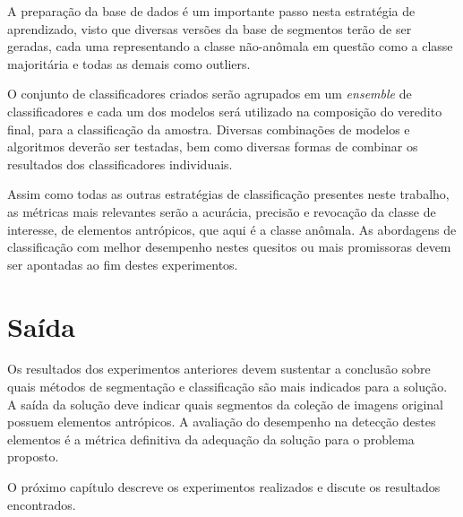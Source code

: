 A preparação da base de dados é um importante passo nesta estratégia de aprendizado, visto que diversas versões da base de segmentos terão de ser geradas, cada uma representando a classe não-anômala em questão como a classe majoritária e todas as demais como outliers.

O conjunto de classificadores criados serão agrupados em um \textit{ensemble} de classificadores e cada um dos modelos será utilizado na composição do veredito final, para a classificação da amostra. Diversas combinações de modelos e algoritmos deverão ser testadas, bem como diversas formas de combinar os resultados dos classificadores individuais.

Assim como todas as outras estratégias de classificação presentes neste trabalho, as métricas mais relevantes serão a acurácia, precisão e revocação da classe de interesse, de elementos antrópicos, que aqui é a classe anômala. As abordagens de classificação com melhor desempenho nestes quesitos ou mais promissoras devem ser apontadas ao fim destes experimentos.

\section{Saída}

 Os resultados dos experimentos anteriores devem sustentar a conclusão sobre quais métodos de segmentação e classificação são mais indicados para a solução. A saída da solução deve indicar quais segmentos da coleção de imagens original possuem elementos antrópicos. A avaliação do desempenho na detecção destes elementos é a métrica definitiva da adequação da solução para o problema proposto.

O próximo capítulo descreve os experimentos realizados e discute os resultados encontrados.